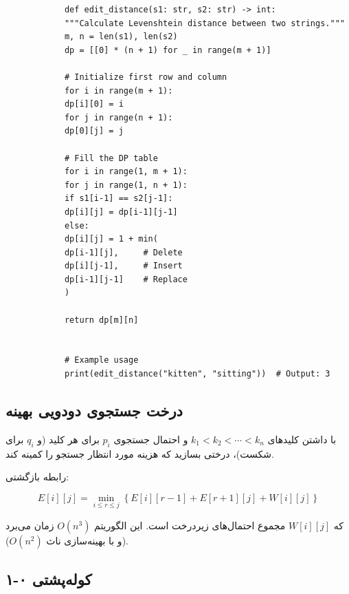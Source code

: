 \documentclass{matinbook}
\begin{document}
    \begin{latin}
        \begin{verbatim}
            def edit_distance(s1: str, s2: str) -> int:
            """Calculate Levenshtein distance between two strings."""
            m, n = len(s1), len(s2)
            dp = [[0] * (n + 1) for _ in range(m + 1)]
            
            # Initialize first row and column
            for i in range(m + 1):
            dp[i][0] = i
            for j in range(n + 1):
            dp[0][j] = j
            
            # Fill the DP table
            for i in range(1, m + 1):
            for j in range(1, n + 1):
            if s1[i-1] == s2[j-1]:
            dp[i][j] = dp[i-1][j-1]
            else:
            dp[i][j] = 1 + min(
            dp[i-1][j],     # Delete
            dp[i][j-1],     # Insert
            dp[i-1][j-1]    # Replace
            )
            
            return dp[m][n]
            
            
            # Example usage
            print(edit_distance("kitten", "sitting"))  # Output: 3
        \end{verbatim}
    \end{latin}
    \label{code:edit-distance}
    
    \subsection{درخت جستجوی دودویی بهینه}
    
    \begin{definition}
        با داشتن کلیدهای $k_{1} < k_{2} < \cdots < k_{n}$
        و احتمال جستجوی $p_{i}$ برای هر کلید
        (و $q_{i}$ برای شکست)، درختی بسازید
        که هزینه مورد انتظار جستجو را کمینه کند.
        \label{def:optimal-bst}
    \end{definition}
    
    رابطه بازگشتی:
    
    \[
    E[i][j] = \min_{i \leq r \leq j} \left\{
    E[i][r-1] + E[r+1][j] + W[i][j]
    \right\}
    \]
    
    که $W[i][j]$ مجموع احتمال‌های زیردرخت است.
    این الگوریتم $O(n^{3})$ زمان می‌برد
    (و با بهینه‌سازی ناث $O(n^{2})$).
    
    \subsection{کوله‌پشتی ۰-۱}
    
\end{document}
